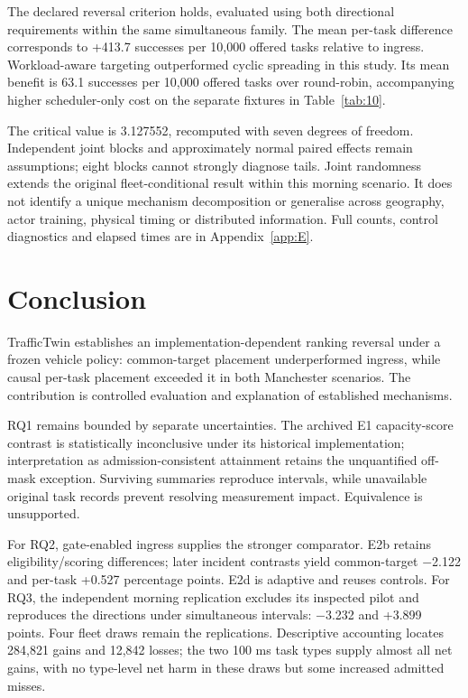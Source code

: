 \documentclass[11pt,a4paper]{article}
\begin{document}
The declared reversal criterion holds, evaluated using both directional requirements within the same simultaneous family. The mean per-task difference corresponds to +413.7 successes per 10,000 offered tasks relative to ingress. Workload-aware targeting outperformed cyclic spreading in this study. Its mean benefit is 63.1 successes per 10,000 offered tasks over round-robin, accompanying higher scheduler-only cost on the separate fixtures in Table~\ref{tab:10}.

The critical value is 3.127552, recomputed with seven degrees of freedom. Independent joint blocks and approximately normal paired effects remain assumptions; eight blocks cannot strongly diagnose tails. Joint randomness extends the original fleet-conditional result within this morning scenario. It does not identify a unique mechanism decomposition or generalise across geography, actor training, physical timing or distributed information. Full counts, control diagnostics and elapsed times are in Appendix~\ref{app:E}.

\section{Conclusion}\label{sec:4}

TrafficTwin establishes an implementation-dependent ranking reversal under a frozen vehicle policy: common-target placement underperformed ingress, while causal per-task placement exceeded it in both Manchester scenarios. The contribution is controlled evaluation and explanation of established mechanisms.

RQ1 remains bounded by separate uncertainties. The archived E1 capacity-score contrast is statistically inconclusive under its historical implementation; interpretation as admission-consistent attainment retains the unquantified off-mask exception. Surviving summaries reproduce intervals, while unavailable original task records prevent resolving measurement impact. Equivalence is unsupported.

For RQ2, gate-enabled ingress supplies the stronger comparator. E2b retains eligibility/scoring differences; later incident contrasts yield common-target \ensuremath{-}2.122 and per-task +0.527 percentage points. E2d is adaptive and reuses controls. For RQ3, the independent morning replication excludes its inspected pilot and reproduces the directions under simultaneous intervals: \ensuremath{-}3.232 and +3.899 points. Four fleet draws remain the replications. Descriptive accounting locates 284,821 gains and 12,842 losses; the two 100 ms task types supply almost all net gains, with no type-level net harm in these draws but some increased admitted misses.
\end{document}
